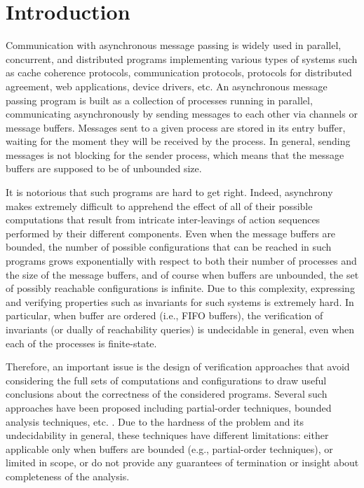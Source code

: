 \section{Introduction}

Communication with asynchronous message passing is widely used in parallel, concurrent, and distributed programs implementing various types of systems such as cache coherence protocols, communication protocols, protocols for distributed agreement, web applications, device drivers, etc. 
%
An asynchronous message passing program is built as a collection of processes running in parallel, communicating asynchronously by sending messages to each other via channels or message buffers. Messages sent to a given process are stored in its entry buffer, waiting for the moment they will be received by the process. In general, sending messages is not blocking for the sender process, which means that the message buffers are supposed to be of unbounded size. 

It is notorious that such programs are hard to get right. Indeed, asynchrony makes extremely difficult to apprehend the effect of all of their possible computations that result from intricate inter-leavings of action sequences performed by their different components. Even when the message buffers are bounded, the number of possible configurations that can be reached in such programs grows exponentially with respect to both their number of processes and the size of the message buffers, and of course when buffers are unbounded, the set of possibly reachable configurations is infinite. Due to this complexity, expressing and verifying properties such as invariants for such systems is extremely hard. In particular, when buffer are ordered (i.e., FIFO buffers), the verification of invariants (or dually of reachability queries) is undecidable in general, even when each of the processes is finite-state.

Therefore, an important issue is the design of verification approaches that avoid considering the full sets of computations and configurations to draw useful conclusions about the correctness of the considered programs. Several such approaches have been proposed including partial-order techniques, bounded analysis techniques, etc. \cite{}. Due to the hardness of the problem and its undecidability in general, these techniques have different limitations: either applicable only when buffers are bounded (e.g., partial-order techniques), or limited in scope, or do not provide any guarantees of termination or insight about completeness of the analysis.

